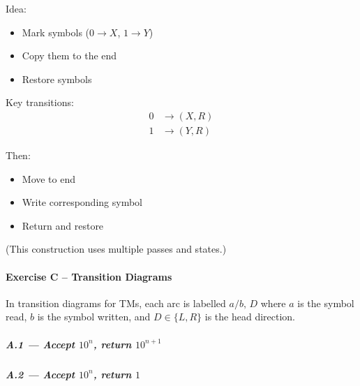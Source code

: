 \documentclass[11pt, a4paper]{article}
\theoremstyle{definition}
\theoremstyle{remark}
\begin{document}
Idea:
\begin{itemize}
    \item Mark symbols ($0 \to X$, $1 \to Y$)
    \item Copy them to the end
    \item Restore symbols
\end{itemize}

Key transitions:
\[
\begin{aligned}
0 &\to (X, R) \\
1 &\to (Y, R)
\end{aligned}
\]

Then:
\begin{itemize}
    \item Move to end
    \item Write corresponding symbol
    \item Return and restore
\end{itemize}

(This construction uses multiple passes and states.)


\paragraph{Exercise C -- Transition Diagrams}

In transition diagrams for TMs, each arc is labelled $a/b,\,D$ where $a$ is the symbol read, $b$ is the symbol written, and $D\in\{L,R\}$ is the head direction.

\subparagraph{A.1 --- Accept $10^n$, return $10^{n+1}$}

\begin{center}
\end{center}

\subparagraph{A.2 --- Accept $10^n$, return $1$}

\begin{center}
\end{center}
\end{document}
